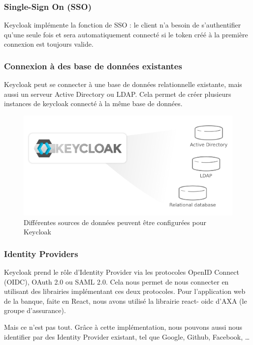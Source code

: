 \subsubsection{Single-Sign On (SSO)}

Keycloak implémente la fonction de SSO : le client n'a besoin de s'authentifier qu'une seule fois et
sera automatiquement connecté si le token créé à la première connexion est toujours valide.

\subsubsection{Connexion à des base de données existantes}

Keycloak peut se connecter à une base de données relationnelle existante, mais aussi un serveur
Active Directory ou LDAP. Cela permet de créer plusieurs instances de keycloak connecté à la même
base de données.

\begin{figure}[H]
    \centering
    \includegraphics[width=\textwidth]{./img/Keycloak-Existant-Data.png}
    \caption{Différentes sources de données peuvent être configurées pour Keycloak}
    \label{fig:keycloak_data_source}
\end{figure}

\subsubsection{Identity Providers}

Keycloak prend le rôle d'Identity Provider via les protocoles OpenID Connect (OIDC), OAuth 2.0 ou
SAML 2.0. Cela nous permet de nous connecter en utilisant des librairies implémentant ces deux
protocoles. Pour l'application web de la banque, faite en React, nous avons utilisé la librairie react-
oidc d'AXA (le groupe d'assurance).

Mais ce n'est pas tout. Grâce à cette implémentation, nous pouvons aussi nous identifier par des
Identity Provider existant, tel que Google, Github, Facebook, \dots

